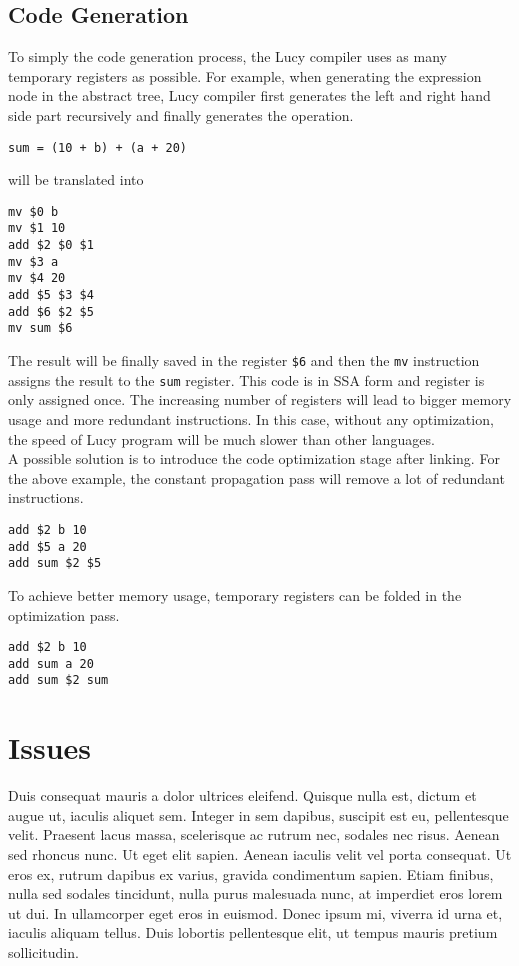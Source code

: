 \subsection{Code Generation}
To simply the code generation process, the Lucy compiler uses as many temporary registers as possible. For example, when generating the expression node in the abstract tree, Lucy compiler first generates the left and right hand side part recursively and finally generates the operation.
\begin{lstlisting}
sum = (10 + b) + (a + 20)
\end{lstlisting}
will be translated into
\begin{lstlisting}[language=LucyX]
mv $0 b
mv $1 10
add $2 $0 $1
mv $3 a
mv $4 20
add $5 $3 $4
add $6 $2 $5
mv sum $6
\end{lstlisting}
The result will be finally saved in the register \texttt{\$6} and then the \texttt{mv} instruction assigns the result to the \texttt{sum} register. This code is in SSA form and register is only assigned once. The increasing number of registers will lead to bigger memory usage and more redundant instructions. In this case, without any optimization, the speed of Lucy program will be much slower than other languages. \\
A possible solution is to introduce the code optimization stage after linking. For the above example, the constant propagation pass will remove a lot of redundant instructions.
\begin{lstlisting}[language=LucyX]
add $2 b 10
add $5 a 20
add sum $2 $5
\end{lstlisting}
To achieve better memory usage, temporary registers can be folded in the optimization pass.
\begin{lstlisting}[language=LucyX]
add $2 b 10
add sum a 20
add sum $2 sum
\end{lstlisting}

\section{Issues}
Duis consequat mauris a dolor ultrices eleifend. Quisque nulla est, dictum et augue ut, iaculis aliquet sem. Integer in sem dapibus, suscipit est eu, pellentesque velit. Praesent lacus massa, scelerisque ac rutrum nec, sodales nec risus. Aenean sed rhoncus nunc. Ut eget elit sapien. Aenean iaculis velit vel porta consequat. Ut eros ex, rutrum dapibus ex varius, gravida condimentum sapien. Etiam finibus, nulla sed sodales tincidunt, nulla purus malesuada nunc, at imperdiet eros lorem ut dui. In ullamcorper eget eros in euismod. Donec ipsum mi, viverra id urna et, iaculis aliquam tellus. Duis lobortis pellentesque elit, ut tempus mauris pretium sollicitudin.
